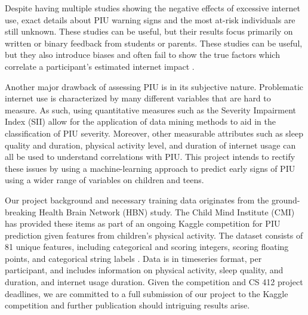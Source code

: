 \documentclass[11pt]{extarticle}
\begin{document}

Despite having multiple studies showing the negative effects of excessive internet use, exact details about PIU warning signs and the most at-risk individuals are still unknown.
These studies can be useful, but their results focus primarily on written or binary feedback from students or parents. 
These studies can be useful, but they also introduce biases and often fail to show the true factors which correlate a participant's estimated internet impact \cite{Restrepo2020-pb,Aboujaoude2010-mc}.

Another major drawback of assessing PIU is in its subjective nature. 
Problematic internet use is characterized by many different variables that are hard to measure. 
As such, using quantitative measures such as the Severity Impairment Index (SII) allow for the application of data mining methods to aid in the classification of PIU severity. 
Moreover, other measurable attributes such as sleep quality and duration, physical activity level, and duration of internet usage can all be used to understand correlations with PIU.
This project intends to rectify these issues by using a machine-learning approach to predict early signs of PIU using a wider range of variables on children and teens.


Our project background and necessary training data originates from the ground-breaking Health Brain Network (HBN) study.
The Child Mind Institute (CMI) has provided these items as part of an ongoing Kaggle competition for PIU prediction given features from children's physical activity. 
The dataset consists of 81 unique features, including categorical and scoring integers, scoring floating points, and categorical string labels \cite{child-mind-institute-problematic-internet-use}.
Data is in timeseries format, per participant, and includes information on physical activity, sleep quality, and duration, and internet usage duration.
Given the competition and CS 412 project deadlines, we are committed to a full submission of our project to the Kaggle competition and further publication should intriguing results arise.
\end{document}
